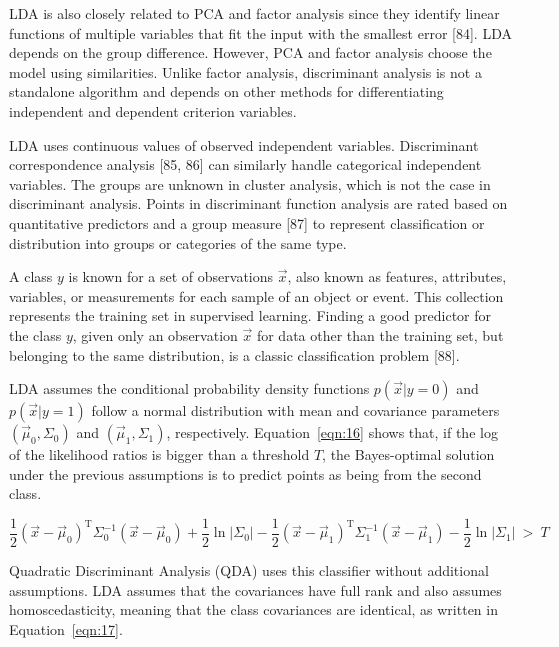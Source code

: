 \documentclass[preprint,12pt]{elsarticle}
\begin{document}
LDA is also closely related to PCA and factor analysis since they identify linear functions of multiple variables that fit the input with the smallest error [84]. LDA depends on the group difference. However, PCA and factor analysis choose the model using similarities. Unlike factor analysis, discriminant analysis is not a standalone algorithm and depends on other methods for differentiating independent and dependent criterion variables.

LDA uses continuous values of observed independent variables. Discriminant correspondence analysis [85, 86] can similarly handle categorical independent variables. The groups are unknown in cluster analysis, which is not the case in discriminant analysis. Points in discriminant function analysis are rated based on quantitative predictors and a group measure [87] to represent classification or distribution into groups or categories of the same type.

A class $y$ is known for a set of observations $\vec{x}$, also known as features, attributes, variables, or measurements for each sample of an object or event. This collection represents the training set in supervised learning. Finding a good predictor for the class $y$, given only an observation $\vec{x}$ for data other than the training set, but belonging to the same distribution, is a classic classification problem [88].

LDA assumes the conditional probability density functions $p({\vec{x}}|y=0)$ and $p({\vec{x}}|y=1)$ follow a normal distribution with mean and covariance parameters $\left({\vec{\mu}}_{0},\Sigma_{0}\right)$ and $\left({\vec{\mu}}_{1},\Sigma_{1}\right)$, respectively. Equation~\ref{eqn:16} shows that, if the log of the likelihood ratios is bigger than a threshold $T$, the Bayes-optimal solution under the previous assumptions is to predict points as being from the second class.

\begin{equation}
	{\frac{1}{2}}({\vec{x}}-{\vec{\mu}}_{0})^{\mathrm{T}}\Sigma_{0}^{-1}({\vec{x}}-{\vec{\mu}}_{0})+{\frac{1}{2}}\ln |\Sigma_{0}|-{\frac{1}{2}}({\vec{x}}-{\vec{\mu}}_{1})^{\mathrm{T}}\Sigma_{1}^{-1}({\vec{x}}-{\vec{\mu}}_{1})-{\frac{1}{2}}\ln |\Sigma_{1}|\ >\ T
	\label{eqn:16}
\end{equation}

Quadratic Discriminant Analysis (QDA) uses this classifier without additional assumptions. LDA assumes that the covariances have full rank and also assumes homoscedasticity, meaning that the class covariances are identical, as written in Equation~\ref{eqn:17}.
\end{document}
